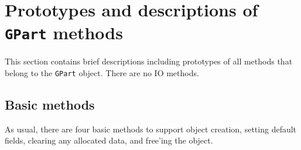 \par
\section{Prototypes and descriptions of {\tt GPart} methods}
\label{section:GPart:proto}
\par
This section contains brief descriptions including prototypes
of all methods that belong to the {\tt GPart} object.
There are no IO methods.
\par
\subsection{Basic methods}
\label{subsection:GPart:proto:basics}
\par
As usual, there are four basic methods to support object creation,
setting default fields, clearing any allocated data, and free'ing
the object.
\par
